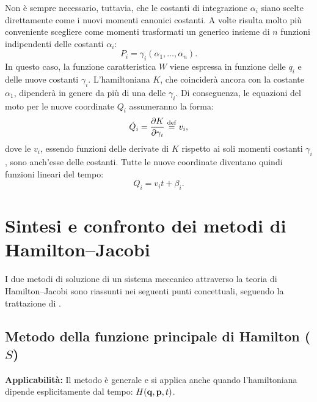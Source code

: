 Non è sempre necessario, tuttavia, che le costanti di integrazione $\alpha_i$ siano scelte direttamente come i nuovi momenti canonici costanti. A volte risulta molto più conveniente scegliere come momenti trasformati un generico insieme di $n$ funzioni indipendenti delle costanti $\alpha_i$:
\begin{equation*}
    P_i = \gamma_i(\alpha_1, \dots, \alpha_n).
\end{equation*}
In questo caso, la funzione caratteristica $W$ viene espressa in funzione delle $q_i$ e delle nuove costanti $\gamma_i$. L'hamiltoniana $K$, che coinciderà ancora con la costante $\alpha_1$, dipenderà in genere da più di una delle $\gamma_i$. Di conseguenza, le equazioni del moto per le nuove coordinate $Q_i$ assumeranno la forma:
\begin{equation*}
    \dot{Q}_i = \pdv{K}{\gamma_i} \overset{\mathrm{def}}{=} v_i,
\end{equation*}
dove le $v_i$, essendo funzioni delle derivate di $K$ rispetto ai soli momenti costanti $\gamma_i$, sono anch'esse delle costanti. Tutte le nuove coordinate diventano quindi funzioni lineari del tempo:
\begin{equation*}
    Q_i = v_i t + \beta_i.
\end{equation*}
\section{Sintesi e confronto dei metodi di Hamilton--Jacobi}

I due metodi di soluzione di un sistema meccanico attraverso la teoria di Hamilton--Jacobi sono riassunti nei seguenti punti concettuali, seguendo la trattazione di .

\subsection{Metodo della funzione principale di Hamilton (\texorpdfstring{$S$}{S})}
\textbf{Applicabilità:} Il metodo è generale e si applica anche quando l'hamiltoniana dipende esplicitamente dal tempo: $H(\vb{q}, \vb{p}, t)$.

